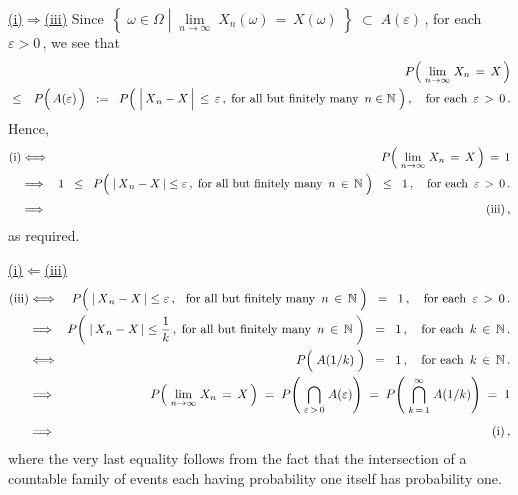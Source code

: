 \vskip 0.5cm
\noindent
\underline{(i)\;$\Longrightarrow$\;(iii)}
\vskip 0.3cm
\noindent
Since
\,$\!\left\{\;
	\omega \in \Omega
	\;\left\vert\;
	\underset{n\rightarrow\infty}{\lim}\;X_{n}(\omega) \,=\, X(\omega)
	\right.
	\;\right\}
\; \subset \; A(\varepsilon)$\,,
for each \,$\varepsilon > 0$\,,
we see that
\begin{eqnarray*}
&&
	P\!\left(\;\underset{n\rightarrow\infty}{\lim}\;X_{n} \,=\, X\,\right)
\\
& \leq &
	P\!\left(\,\overset{{\color{white}.}}A(\varepsilon)\,\right)
	\;\; := \;\;
		P\!\left(\;
			\left\vert\,\overset{{\color{white}.}}{X}_{n} - X\,\right\vert \,\leq\, \varepsilon\,,\;
			\textnormal{for all but finitely many \,$n \in \N$}
			\;\right),
	\quad\textnormal{for each \,$\varepsilon \,>\, 0$}\,.
\end{eqnarray*}
Hence,
\begin{eqnarray*}
\textnormal{(i)}
& \Longleftrightarrow  &
	P\!\left(\;\underset{n\rightarrow\infty}{\lim}\;X_{n} \,=\, X\,\right) \, = \, 1
\\
& \Longrightarrow &
	1
	\;\; \leq \;\;
		P\!\left(\;
			\vert\,\overset{{\color{white}.}}{X}_{n} - X\,\vert \leq \varepsilon\,,
			\;\textnormal{for all but finitely many \,$n \,\in\, \N$}
			\;\right)
	\;\; \leq \;\;
		1\,,
	\quad\textnormal{for each \,$\varepsilon \,>\, 0$}\,.
\\
& \Longrightarrow &
	\overset{{\color{white}.}}{\textnormal{(iii)}}\,,
\end{eqnarray*}
as required.

\vskip 0.8cm
\noindent
\underline{(i)\;$\Longleftarrow$\;(iii)}
\vskip 0.3cm
\noindent
\begin{eqnarray*}
\textnormal{(iii)}
& \Longleftrightarrow  &
	P\!\left(\;
		\vert\,\overset{{\color{white}.}}{X}_{n} - X\,\vert \leq \varepsilon\,,
		\,\;\;\textnormal{for all but finitely many \,$n \,\in\, \N$}
		\;\right)
	\;\; = \;\; 1\,,
	\quad\textnormal{for each \,$\varepsilon \,>\, 0$}\,.
\\
& \Longrightarrow  &
	P\!\left(\;
		\vert\,\overset{{\color{white}.}}{X}_{n} - X\,\vert \leq \dfrac{1}{k}\,,
		\;\textnormal{for all but finitely many \,$n \,\in\, \N$}
		\;\right)
	\;\; = \;\; 1\,,
	\quad\textnormal{for each \,$k \,\in\, \N$}\,.
\\
& \overset{{\color{white}-}}{\Longleftrightarrow}  &
	P\!\left(\; \overset{{\color{white}.}}{A}(1/k) \;\right)
	\;\; = \;\; 1\,,
	\quad\textnormal{for each \,$k \,\in\, \N$}\,.
\\
& \overset{{\color{white}\vert}}{\Longrightarrow}  &
	P\!\left(\;\underset{n\rightarrow\infty}{\lim}\;X_{n} \,=\, X\,\right)
	\; = \;
	P\!\left(\; \underset{\varepsilon\,>\,0}{\bigcap}\; A(\varepsilon) \right)
	\; = \;
	P\!\left(\; \overset{\infty}{\underset{k\,=\,1}{\bigcap}}\; A(1/k) \right)
	\; = \;
		1
\\
& \overset{{\color{white}\vert}}{\Longrightarrow}  &
	\textnormal{(i)}\,,
\end{eqnarray*}
where the very last equality follows from the fact that the intersection of
a countable family of events each having probability one itself has probability one.

